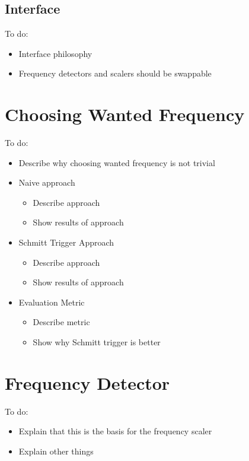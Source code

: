 \subsection{Interface}

\color{red}
To do:
\begin{itemize}
	\item Interface philosophy
	\item Frequency detectors and scalers should be swappable
\end{itemize}
\color{black}

\section{Choosing Wanted Frequency}

\color{red}
To do:
\begin{itemize}
	\item Describe why choosing wanted frequency is not trivial
	\item Naive approach
	\begin{itemize}
		\item Describe approach
		\item Show results of approach
	\end{itemize}
	\item Schmitt Trigger Approach
	\begin{itemize}
		\item Describe approach
		\item Show results of approach
	\end{itemize}
	\item Evaluation Metric
	\begin{itemize}
		\item Describe metric
		\item Show why Schmitt trigger is better
	\end{itemize}
\end{itemize}
\color{black}

\section{Frequency Detector}

\color{red}
To do:
\begin{itemize}
	\item Explain that this is the basis for the frequency scaler
	\item Explain other things
\end{itemize}
\color{black}

